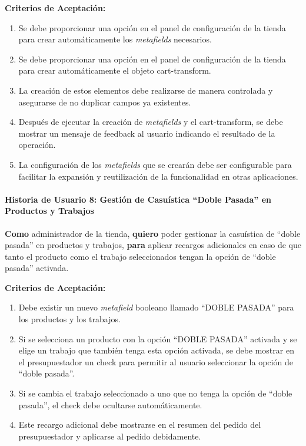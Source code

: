 \documentclass[12pt]{article}
\newcommand{\subsubsubsection}[1]{\paragraph{#1}}
\begin{document}
\vspace{0.5cm}
\textbf{Criterios de Aceptación:}
\begin{enumerate}[label=\arabic*.]
    \item Se debe proporcionar una opción en el panel de configuración de la tienda para crear automáticamente los \textit{metafields} necesarios.
    \item Se debe proporcionar una opción en el panel de configuración de la tienda para crear automáticamente el objeto cart-transform.
    \item La creación de estos elementos debe realizarse de manera controlada y asegurarse de no duplicar campos ya existentes.
    \item Después de ejecutar la creación de \textit{metafields} y el cart-transform, se debe mostrar un mensaje de feedback al usuario indicando el resultado de la operación.
    \item La configuración de los \textit{metafields} que se crearán debe ser configurable para facilitar la expansión y reutilización de la funcionalidad en otras aplicaciones.
\end{enumerate}


\subsubsubsection{Historia de Usuario 8: Gestión de Casuística ``Doble Pasada'' en Productos y Trabajos}\label{sec:historia8}

\textbf{Como} administrador de la tienda,
\textbf{quiero} poder gestionar la casuística de ``doble pasada'' en productos y trabajos,
\textbf{para} aplicar recargos adicionales en caso de que tanto el producto como el trabajo seleccionados tengan la opción de ``doble pasada'' activada.

\vspace{0.5cm}
\textbf{Criterios de Aceptación:}
\begin{enumerate}[label=\arabic*.]
    \item Debe existir un nuevo \textit{metafield} booleano llamado ``DOBLE PASADA'' para los productos y los trabajos.
    \item Si se selecciona un producto con la opción ``DOBLE PASADA'' activada y se elige un trabajo que también tenga esta opción activada, se debe mostrar en el presupuestador un check para permitir al usuario seleccionar la opción de ``doble pasada''.
    \item Si se cambia el trabajo seleccionado a uno que no tenga la opción de ``doble pasada'', el check debe ocultarse automáticamente.
    \item Este recargo adicional debe mostrarse en el resumen del pedido del presupuestador y aplicarse al pedido debidamente.
\end{enumerate}
\end{document}
